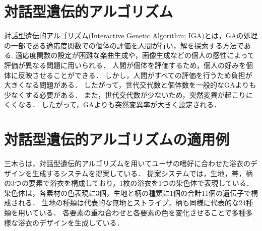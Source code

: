 \section{対話型遺伝的アルゴリズム}
対話型遺伝的アルゴリズム(Interactive Genetic Algorithm; IGA)とは，GAの処理の一部である適応度関数での個体の評価を人間が行い，解を探索する方法である.
適応度関数の設定が困難な楽曲生成や，画像生成などの個人の感性によって評価が異なる問題に用いられる．
人間が個体を評価するため，個人の好みを個体に反映させることができる．
しかし，人間がすべての評価を行うため負担が大きくなる問題がある．
したがって，世代交代数と個体数を一般的なGAよりも少なくする必要がある．
また，世代交代数が少ないため，突然変異が起こりにくくなる．
したがって，GAよりも突然変異率が大きく設定される．

\section{対話型遺伝的アルゴリズムの適用例}
三木ら\cite{miki07}は，対話型遺伝的アルゴリズムを用いてユーザの嗜好に合わせた浴衣のデザインを生成するシステムを提案している．
提案システムでは，生地，帯，柄の3つの要素で浴衣を構成しており，1枚の浴衣を1つの染色体で表現している．
染色体は，各素材の色表現に3個，生地と柄の種類に1個の合計11個の遺伝子で構成される．
生地の種類は代表的な無地とストライプ，柄も同様に代表的な24種類を用いている．
各要素の重ね合わせと各要素の色を変化させることで多種多様な浴衣のデザインを生成している．
